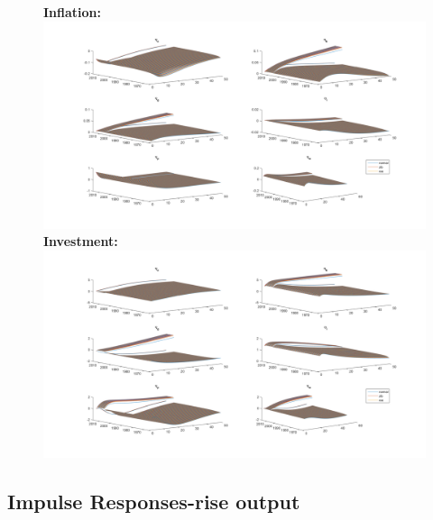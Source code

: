 \documentclass[12pt,reqno]{article}
\numberwithin{equation}{section}
\begin{document}
\begin{figure}[H]
\textbf{Inflation:}\\
\includegraphics[scale=0.5]{AR1_impresp_pinf_3d.pdf}
\textbf{Investment:}\\
\includegraphics[scale=0.5]{AR1_impresp_inve_3d.pdf}
\end{figure}

\subsection*{Impulse Responses-rise output}
\end{document}
